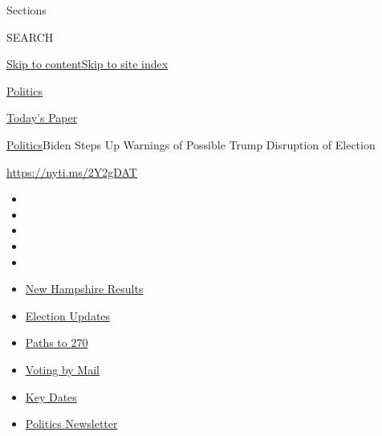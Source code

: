 Sections

SEARCH

\protect\hyperlink{site-content}{Skip to
content}\protect\hyperlink{site-index}{Skip to site index}

\href{https://www.nytimes3xbfgragh.onion/section/politics}{Politics}

\href{https://myaccount.nytimes3xbfgragh.onion/auth/login?response_type=cookie\&client_id=vi}{}

\href{https://www.nytimes3xbfgragh.onion/section/todayspaper}{Today's
Paper}

\href{/section/politics}{Politics}\textbar{}Biden Steps Up Warnings of
Possible Trump Disruption of Election

\url{https://nyti.ms/2Y2gDAT}

\begin{itemize}
\item
\item
\item
\item
\item
\end{itemize}

\begin{itemize}
\item
  \href{https://www.nytimes3xbfgragh.onion/interactive/2020/09/08/us/elections/results-new-hampshire-primary-elections.html?action=click\&pgtype=Article\&state=default\&region=TOP_BANNER\&context=storylines_menu}{New
  Hampshire Results}
\item
  \href{https://www.nytimes3xbfgragh.onion/live/2020/09/08/us/trump-vs-biden?action=click\&pgtype=Article\&state=default\&region=TOP_BANNER\&context=storylines_menu}{Election
  Updates}
\item
  \href{https://www.nytimes3xbfgragh.onion/interactive/2020/us/elections/election-states-biden-trump.html?action=click\&pgtype=Article\&state=default\&region=TOP_BANNER\&context=storylines_menu}{Paths
  to 270}
\item
  \href{https://www.nytimes3xbfgragh.onion/interactive/2020/08/31/us/politics/vote-by-mail-deadlines.html?action=click\&pgtype=Article\&state=default\&region=TOP_BANNER\&context=storylines_menu}{Voting
  by Mail}
\item
  \href{https://www.nytimes3xbfgragh.onion/interactive/2019/us/elections/2020-presidential-election-calendar.html?action=click\&pgtype=Article\&state=default\&region=TOP_BANNER\&context=storylines_menu}{Key
  Dates}
\item
  \href{https://www.nytimes3xbfgragh.onion/newsletters/politics?action=click\&pgtype=Article\&state=default\&region=TOP_BANNER\&context=storylines_menu}{Politics
  Newsletter}
\end{itemize}


